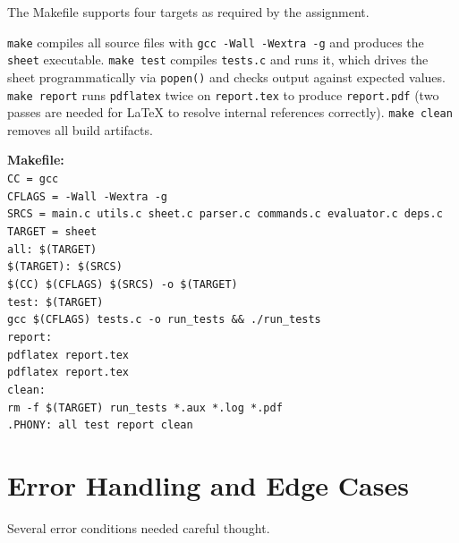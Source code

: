 \documentclass[11pt,a4paper]{article}
\begin{document}
The Makefile supports four targets as required by the assignment.

\texttt{make} compiles all source files with \texttt{gcc -Wall -Wextra -g} and produces the \texttt{sheet} executable. \texttt{make test} compiles \texttt{tests.c} and runs it, which drives the sheet programmatically via \texttt{popen()} and checks output against expected values. \texttt{make report} runs \texttt{pdflatex} twice on \texttt{report.tex} to produce \texttt{report.pdf} (two passes are needed for LaTeX to resolve internal references correctly). \texttt{make clean} removes all build artifacts.

\begin{notebox}
\textbf{Makefile:}\\[4pt]
\texttt{CC = gcc}\\
\texttt{CFLAGS = -Wall -Wextra -g}\\[4pt]
\texttt{SRCS = main.c utils.c sheet.c parser.c commands.c evaluator.c deps.c}\\
\texttt{TARGET = sheet}\\[4pt]
\texttt{all: \$(TARGET)}\\[2pt]
\texttt{\$(TARGET): \$(SRCS)}\\
\texttt{\hspace{1.5em}\$(CC) \$(CFLAGS) \$(SRCS) -o \$(TARGET)}\\[4pt]
\texttt{test: \$(TARGET)}\\
\texttt{\hspace{1.5em}gcc \$(CFLAGS) tests.c -o run\_tests \&\& ./run\_tests}\\[4pt]
\texttt{report:}\\
\texttt{\hspace{1.5em}pdflatex report.tex}\\
\texttt{\hspace{1.5em}pdflatex report.tex}\\[4pt]
\texttt{clean:}\\
\texttt{\hspace{1.5em}rm -f \$(TARGET) run\_tests *.aux *.log *.pdf}\\[4pt]
\texttt{.PHONY: all test report clean}
\end{notebox}

\section{Error Handling and Edge Cases}

Several error conditions needed careful thought.
\end{document}
